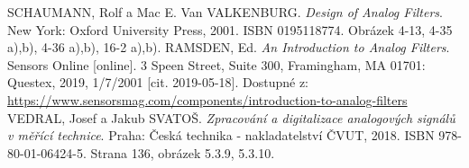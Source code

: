\begin{thebibliography}{999}
SCHAUMANN, Rolf a Mac E. Van VALKENBURG. \textit{Design of Analog Filters}. New York: Oxford University Press, 2001. ISBN 0195118774. Obrázek 4-13, 4-35 a),b), 4-36 a),b), 16-2 a),b).
RAMSDEN, Ed. \textit{An Introduction to Analog Filters}. Sensors Online [online]. 3 Speen Street, Suite 300, Framingham, MA 01701: Questex, 2019, 1/7/2001 [cit. 2019-05-18]. Dostupné z: \url{https://www.sensorsmag.com/components/introduction-to-analog-filters}
VEDRAL, Josef a Jakub SVATOŠ. \textit{Zpracování a digitalizace analogových signálů v měřící technice}. Praha: Česká technika - nakladatelství ČVUT, 2018. ISBN 978-80-01-06424-5. Strana 136, obrázek 5.3.9, 5.3.10.
\end{thebibliography}
